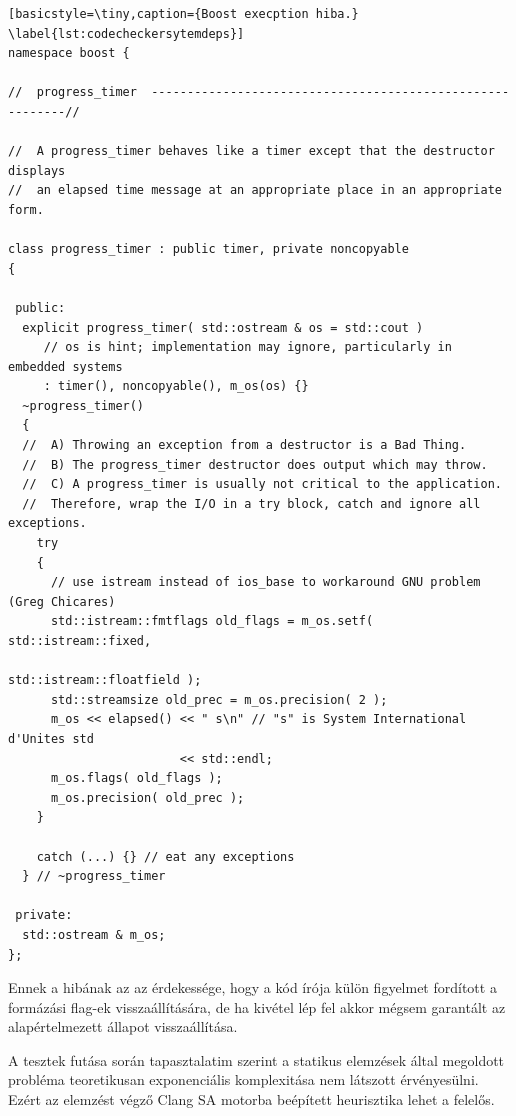 \documentclass[a4paper,12pt]{report}
\begin{document}
\begin{minipage}{\linewidth}
\begin{lstlisting}[basicstyle=\tiny,caption={Boost execption hiba.}
\label{lst:codecheckersytemdeps}]
namespace boost {

//  progress_timer  ----------------------------------------------------------//

//  A progress_timer behaves like a timer except that the destructor displays
//  an elapsed time message at an appropriate place in an appropriate form.

class progress_timer : public timer, private noncopyable
{

 public:
  explicit progress_timer( std::ostream & os = std::cout )
     // os is hint; implementation may ignore, particularly in embedded systems
     : timer(), noncopyable(), m_os(os) {}
  ~progress_timer()
  {
  //  A) Throwing an exception from a destructor is a Bad Thing.
  //  B) The progress_timer destructor does output which may throw.
  //  C) A progress_timer is usually not critical to the application.
  //  Therefore, wrap the I/O in a try block, catch and ignore all exceptions.
    try
    {
      // use istream instead of ios_base to workaround GNU problem (Greg Chicares)
      std::istream::fmtflags old_flags = m_os.setf( std::istream::fixed,
                                                   std::istream::floatfield );
      std::streamsize old_prec = m_os.precision( 2 );
      m_os << elapsed() << " s\n" // "s" is System International d'Unites std
                        << std::endl;
      m_os.flags( old_flags );
      m_os.precision( old_prec );
    }

    catch (...) {} // eat any exceptions
  } // ~progress_timer

 private:
  std::ostream & m_os;
}; 
\end{lstlisting}
\end{minipage}

Ennek a hibának az az érdekessége, hogy a kód írója külön figyelmet fordított a formázási flag-ek visszaállítására, de ha kivétel lép fel akkor mégsem garantált az alapértelmezett állapot visszaállítása.

A tesztek futása során tapasztalatim szerint a statikus elemzések által megoldott probléma teoretikusan exponenciális komplexitása nem látszott érvényesülni. Ezért az elemzést végző Clang SA motorba beépített heurisztika lehet a felelős.
\end{document}
